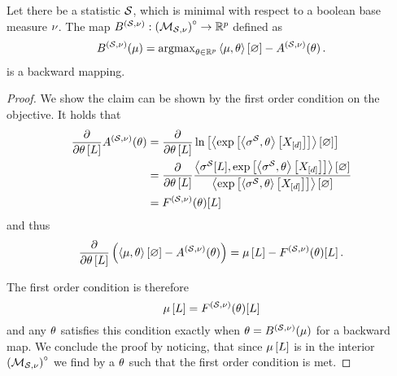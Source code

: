 \begin{theorem}
    \label{the:varBackward}
    Let there be a statistic $\mathcal{S}$, which is minimal with respect to a boolean base measure $\nu$.
    The map $B^{(\mathcal{S},\nu)}: {\left(\mathcal{M}_{\mathcal{S},\nu}\right)}^{\circ}\rightarrow\mathbb{R}^{p}$ defined as
    \begin{align*}
        B^{(\mathcal{S},\nu)}(\mu)
        = \mathrm{argmax}_{\theta\in\mathbb{R}^{p}}  \left\langle \mu,\theta\right\rangle \left[ \varnothing \right] - A^{(\mathcal{S},\nu)}(\theta) \, .
    \end{align*}
    is a backward mapping.
\end{theorem}
\begin{proof}
    We show the claim can be shown by the first order condition on the objective.
    It holds that
    \begin{align*}
        \frac{\partial }{\partial \theta\left[L\right]}  A^{(\mathcal{S},\nu)}(\theta)
        & = \frac{\partial }{\partial \theta\left[L\right]}  \ln \left[ \left\langle \mathrm{exp}\left[\left\langle \sigma^{\mathcal{S}},\theta\right\rangle \left[ X_{[d]} \right]\right]\right\rangle \left[ \varnothing \right] \right] \\
        & = \frac{\partial }{\partial \theta\left[L\right]} \frac{\left\langle \sigma^{\mathcal{S}}[L],\mathrm{exp}\left[\left\langle \sigma^{\mathcal{S}},\theta\right\rangle \left[ X_{[d]} \right]\right]\right\rangle \left[ \varnothing \right]}{\left\langle \mathrm{exp}\left[\left\langle \sigma^{\mathcal{S}},\theta\right\rangle \left[ X_{[d]} \right]\right]\right\rangle \left[ \varnothing \right]}   \\
        & = F^{(\mathcal{S},\nu)}(\theta)[L]
    \end{align*}
    and thus
    \begin{align*}
        \frac{\partial }{\partial \theta\left[L\right]} \left( \left\langle \mu,\theta\right\rangle \left[ \varnothing \right] - A^{(\mathcal{S},\nu)}(\theta)  \right)
        = \mu\left[L\right] -  F^{(\mathcal{S},\nu)}(\theta)[L] \, .
    \end{align*}

    The first order condition is therefore
    \[ \mu\left[L\right] =  F^{(\mathcal{S},\nu)}(\theta)[L] \]
    and any $\theta$ satisfies this condition exactly when $\theta=B^{(\mathcal{S},\nu)}(\mu)$ for a backward map.
    We conclude the proof by noticing, that since $\mu\left[L\right]$ is in the interior ${\left(\mathcal{M}_{\mathcal{S},\nu}\right)}^{\circ}$ we find by  a $\theta$ such that the first order condition is met.
\end{proof}


